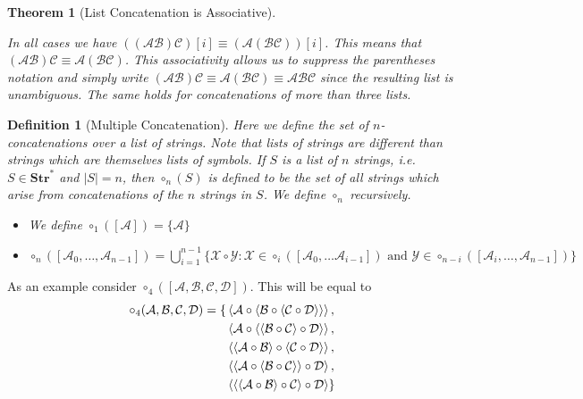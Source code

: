 \documentclass[12pt]{article}
\theoremstyle{break}
\newtheorem{definition}{Definition}[section]
\theoremstyle{break}
\newtheorem{theorem}{Theorem}[section]
\theoremstyle{break}
\theoremstyle{break}
\newcommand{\mc}[1]{\mathcal{#1}}
\begin{document}
\begin{theorem}[List Concatenation is Associative]
\begin{itemize}
In all cases we have $((\mc{A}\mc{B})\mc{C})[i] \equiv (\mc{A}(\mc{B}\mc{C}))[i]$.
This means that $(\mc{A}\mc{B})\mc{C} \equiv \mc{A}(\mc{B}\mc{C})$. 
This associativity allows us to suppress the parentheses notation and simply write $(\mc{A}\mc{B})\mc{C} \equiv \mc{A}(\mc{B}\mc{C}) \equiv \mc{A}\mc{B}\mc{C}$ since the resulting list is unambiguous.
The same holds for concatenations of more than three lists.
\end{itemize}
\end{theorem}

\begin{definition}[Multiple Concatenation]
Here we define the set of $n$-concatenations over a list of strings. 
Note that lists of strings are different than strings which are themselves lists of symbols.
If $S$ is a list of $n$ strings, i.e. $S\in \textbf{Str}^*$ and $|S| = n$, then $\circ_n(S)$ is defined to be the set of all strings which arise from concatenations of the $n$ strings in $S$.
We define $\circ_n$ recursively.

\begin{itemize}
\item{We define $\circ_1([\mc{A}]) = \{\mc{A}\}$}
\item{$\circ_n([\mc{A}_0,\ldots, \mc{A}_{n-1}]) = \bigcup_{i=1}^{n-1} \{\mc{X}\circ\mc{Y}:\mc{X} \in \circ_i([\mc{A}_0,\ldots \mc{A}_{i-1}]) \text{ and } \mc{Y}\in \circ_{n-i}([\mc{A}_{i}, \ldots, \mc{A}_{n-1}])\}$}
\end{itemize}

\end{definition}

As an example consider $\circ_4([\mc{A}, \mc{B}, \mc{C}, \mc{D}])$. This will be equal to
\begin{align*}
\circ_4(\mc{A}, \mc{B}, \mc{C}, \mc{D}) = \{&\Braket{\mc{A}\circ\Braket{\mc{B}\circ\Braket{\mc{C}\circ\mc{D}}}},\\
&\Braket{\mc{A}\circ\Braket{\Braket{\mc{B}\circ\mc{C}}\circ\mc{D}}},\\
&\Braket{\Braket{\mc{A}\circ\mc{B}}\circ\Braket{\mc{C}\circ\mc{D}}},\\
&\Braket{\Braket{\mc{A}\circ\Braket{\mc{B}\circ\mc{C}}}\circ\mc{D}},\\
&\Braket{\Braket{\Braket{\mc{A}\circ\mc{B}}\circ\mc{C}}\circ\mc{D}}\}
\end{align*}
\end{document}

